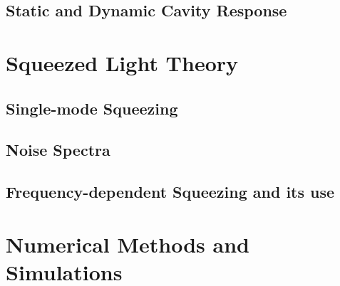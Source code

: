 \subsection{Static and Dynamic Cavity Response}
\section{Squeezed Light Theory}
\subsection{Single-mode Squeezing}
\subsection{Noise Spectra }
\subsection{Frequency-dependent Squeezing and its use}

\section{Numerical Methods and Simulations}
